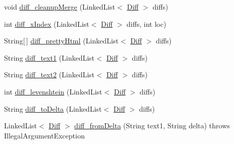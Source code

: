 \begin{DoxyCompactItemize}
\item 
void \hyperlink{classorg_1_1buildmlearn_1_1toolkit_1_1utilities_1_1diff__match__patch_a0b7ca7d67b19884795e7ab14cc407789}{diff\+\_\+cleanup\+Merge} (Linked\+List$<$ \hyperlink{classorg_1_1buildmlearn_1_1toolkit_1_1utilities_1_1diff__match__patch_1_1Diff}{Diff} $>$ diffs)
\item 
int \hyperlink{classorg_1_1buildmlearn_1_1toolkit_1_1utilities_1_1diff__match__patch_ac3f5bac45bc1e4a8a8e8170674fdd89d}{diff\+\_\+x\+Index} (Linked\+List$<$ \hyperlink{classorg_1_1buildmlearn_1_1toolkit_1_1utilities_1_1diff__match__patch_1_1Diff}{Diff} $>$ diffs, int loc)
\item 
String\mbox{[}$\,$\mbox{]} \hyperlink{classorg_1_1buildmlearn_1_1toolkit_1_1utilities_1_1diff__match__patch_adf54356a57b436b5fa2033012300c709}{diff\+\_\+pretty\+Html} (Linked\+List$<$ \hyperlink{classorg_1_1buildmlearn_1_1toolkit_1_1utilities_1_1diff__match__patch_1_1Diff}{Diff} $>$ diffs)
\item 
String \hyperlink{classorg_1_1buildmlearn_1_1toolkit_1_1utilities_1_1diff__match__patch_a4f041137787e82747d1b3d862afbded7}{diff\+\_\+text1} (Linked\+List$<$ \hyperlink{classorg_1_1buildmlearn_1_1toolkit_1_1utilities_1_1diff__match__patch_1_1Diff}{Diff} $>$ diffs)
\item 
String \hyperlink{classorg_1_1buildmlearn_1_1toolkit_1_1utilities_1_1diff__match__patch_a1a638543c64633431affd8936927bdd1}{diff\+\_\+text2} (Linked\+List$<$ \hyperlink{classorg_1_1buildmlearn_1_1toolkit_1_1utilities_1_1diff__match__patch_1_1Diff}{Diff} $>$ diffs)
\item 
int \hyperlink{classorg_1_1buildmlearn_1_1toolkit_1_1utilities_1_1diff__match__patch_a61a85e54e5b6c714fafb80d5c5de4408}{diff\+\_\+levenshtein} (Linked\+List$<$ \hyperlink{classorg_1_1buildmlearn_1_1toolkit_1_1utilities_1_1diff__match__patch_1_1Diff}{Diff} $>$ diffs)
\item 
String \hyperlink{classorg_1_1buildmlearn_1_1toolkit_1_1utilities_1_1diff__match__patch_a45f4e09004cd92f4fa815425e5847219}{diff\+\_\+to\+Delta} (Linked\+List$<$ \hyperlink{classorg_1_1buildmlearn_1_1toolkit_1_1utilities_1_1diff__match__patch_1_1Diff}{Diff} $>$ diffs)
\item 
Linked\+List$<$ \hyperlink{classorg_1_1buildmlearn_1_1toolkit_1_1utilities_1_1diff__match__patch_1_1Diff}{Diff} $>$ \hyperlink{classorg_1_1buildmlearn_1_1toolkit_1_1utilities_1_1diff__match__patch_af912c45fbc9fda41a237976f4cbb66bf}{diff\+\_\+from\+Delta} (String text1, String delta)  throws Illegal\+Argument\+Exception 
\item 

\end{DoxyCompactItemize}

